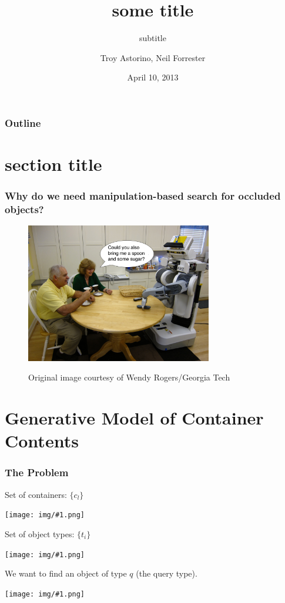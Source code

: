 \documentclass{beamer}
\title{some title}
\subtitle{subtitle}
\author{Troy Astorino, Neil Forrester}
\date{April 10, 2013}
\institute[6.834 -- MIT]{Cognitive Robotics \\ Massachusetts Institute of Technology}
\def \spL [#1]{\texttt{[image: img/\#1.png]}}
\begin{document}
\begin{frame}
	\maketitle
\end{frame}

\begin{frame}
	\frametitle{Outline}
	\tableofcontents
\end{frame}

\section{section title}
\begin{frame}
	\frametitle{Why do we need manipulation-based search for occluded
          objects?}
        \begin{figure}
          \centering
          \includegraphics[width=3.2in]{img/robot_in_kitchen.jpg}

          \tiny{Original image courtesy of Wendy Rogers/Georgia Tech}
        \end{figure}
\end{frame}

\section{Generative Model of Container Contents}
\begin{frame}
	\frametitle{The Problem}
	\begin{center}
		\vspace{-0.13in}
		Set of containers: $\{c_l\}$

		\spL[3-unknown-containers]

		Set of object types: $\{t_i\}$

		\spL[shape-universe-small]

		We want to find an object of type $q$ (the query type).

		\spL[blue-circle]

	\end{center}
\end{frame}
\end{document}
